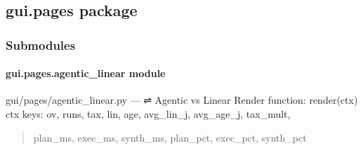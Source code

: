 \documentclass[letterpaper,10pt,english]{sphinxmanual}
\begin{document}
\subsection{gui.pages package}
\label{\detokenize{gui.pages:gui-pages-package}}\label{\detokenize{gui.pages::doc}}

\subsubsection{Submodules}
\label{\detokenize{gui.pages:submodules}}
\sphinxstepscope


\paragraph{gui.pages.agentic\_linear module}
\label{\detokenize{gui.pages.agentic_linear:module-gui.pages.agentic_linear}}\label{\detokenize{gui.pages.agentic_linear:gui-pages-agentic-linear-module}}\label{\detokenize{gui.pages.agentic_linear::doc}}
\sphinxAtStartPar
gui/pages/agentic\_linear.py  —  ⇌  Agentic vs Linear
Render function: render(ctx)
ctx keys: ov, runs, tax, lin, age, avg\_lin\_j, avg\_age\_j, tax\_mult,
\begin{quote}

\sphinxAtStartPar
plan\_ms, exec\_ms, synth\_ms, plan\_pct, exec\_pct, synth\_pct
\end{quote}

\begin{fulllineitems}
\label{\detokenize{gui.pages.agentic_linear:gui.pages.agentic_linear.render}}
\pysigstartsignatures
\pysiglinewithargsret
{}
{}
{}
\pysigstopsignatures
\end{fulllineitems}


\sphinxstepscope
\end{document}
